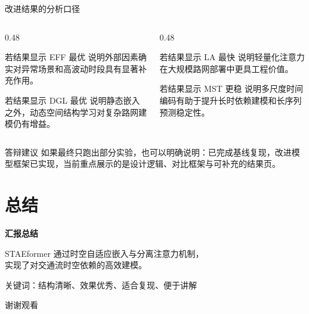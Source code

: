 \documentclass[10pt,aspectratio=169]{ctexbeamer}
\begin{document}
\begin{frame}{改进结果的分析口径}
  \begin{columns}[T]
    \begin{column}{0.48\textwidth}
      \begin{block}{若结果显示 EFF 最优}
        说明外部因素确实对异常场景和高波动时段具有显著补充作用。
      \end{block}

      \begin{block}{若结果显示 DGL 最优}
        说明静态嵌入之外，动态空间结构学习对复杂路网建模仍有增益。
      \end{block}
    \end{column}
    \begin{column}{0.48\textwidth}
      \begin{block}{若结果显示 LA 最快}
        说明轻量化注意力在大规模路网部署中更具工程价值。
      \end{block}

      \begin{block}{若结果显示 MST 更稳}
        说明多尺度时间编码有助于提升长时依赖建模和长序列预测稳定性。
      \end{block}
    \end{column}
  \end{columns}

  \vspace{0.15cm}
  \begin{alertblock}{答辩建议}
    如果最终只跑出部分实验，也可以明确说明：已完成基线复现，改进模型框架已实现，当前重点展示的是设计逻辑、对比框架与可补充的结果页。
  \end{alertblock}
\end{frame}

\section{总结}

\begin{frame}[plain]

  \vspace*{2.1cm}
  \begin{center}
    {\color{white}\fontsize{24}{30}\selectfont\bfseries 汇报总结\par}
    \vspace{0.55cm}
    {\color{white!92}\Large STAEformer 通过时空自适应嵌入与分离注意力机制，\\实现了对交通流时空依赖的高效建模。\par}
    \vspace{0.9cm}
    {\color{white!85}\large 关键词：结构清晰、效果优秀、适合复现、便于讲解}
  \end{center}
\end{frame}

\begin{frame}[standout]
  谢谢观看
\end{frame}
\end{document}
